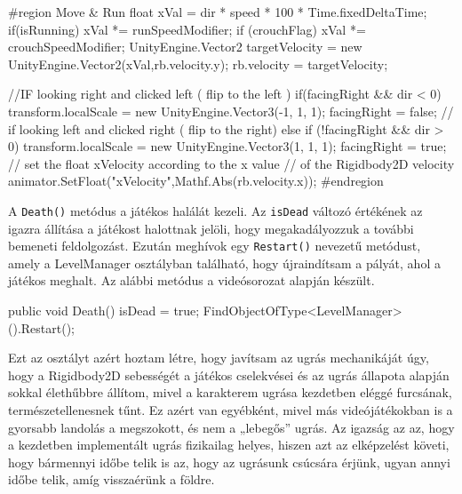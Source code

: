 \begin{java}
    #region Move & Run
    float xVal = dir * speed * 100 * Time.fixedDeltaTime;
    if(isRunning)
    {
        xVal *= runSpeedModifier;
    }
    if (crouchFlag)
    {
        xVal *= crouchSpeedModifier;
    }
    UnityEngine.Vector2 targetVelocity = 
        new UnityEngine.Vector2(xVal,rb.velocity.y);
    rb.velocity = targetVelocity;

    //IF looking right and clicked left ( flip to the left )
    if(facingRight && dir < 0)
    {
        transform.localScale = 
            new UnityEngine.Vector3(-1, 1, 1);
        facingRight = false;
    }
    // if looking left and clicked right ( flip to the right)
    else if (!facingRight && dir > 0) 
    {
        transform.localScale = 
            new UnityEngine.Vector3(1, 1, 1);
        facingRight = true;   
    }
    // set the float xVelocity according to the x value
    // of the Rigidbody2D velocity
    animator.SetFloat("xVelocity",Mathf.Abs(rb.velocity.x));
    #endregion
\end{java}

A \texttt{Death()} metódus a játékos halálát kezeli. Az \texttt{isDead} változó értékének az igazra állítása a játékost halottnak jelöli, hogy megakadályozzuk a további bemeneti feldolgozást. Ezután meghívok egy \texttt{Restart()} nevezetű metódust, amely a LevelManager osztályban található, hogy újraindítsam a pályát, ahol a játékos meghalt. Az alábbi metódus a \cite{youtubeplaylist} videósorozat alapján készült.

\begin{java}
public void Death()
{
    isDead = true;
    FindObjectOfType<LevelManager>().Restart();
}
\end{java}


Ezt az osztályt azért hoztam létre, hogy javítsam az ugrás mechanikáját úgy, hogy a Rigidbody2D sebességét a játékos cselekvései és az ugrás állapota alapján sokkal élethűbbre állítom, mivel a karakterem ugrása kezdetben eléggé furcsának, természetellenesnek tűnt. Ez azért van egyébként, mivel más videójátékokban is a gyorsabb landolás a megszokott, és nem a „lebegős” ugrás. Az igazság az az, hogy a kezdetben implementált ugrás fizikailag helyes, hiszen azt az elképzelést követi, hogy bármennyi időbe telik is az, hogy az ugrásunk csúcsára érjünk, ugyan annyi időbe telik, amíg visszaérünk a földre.\cite{betterjump}

